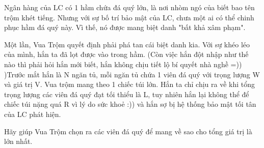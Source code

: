 Ngân hàng của LC có 1 hầm chứa đá quý lớn, là nơi nhòm ngó của biết bao tên trộm khét tiếng. Nhưng với sự bố trí bảo mật của LC, chưa một ai có thể chinh phục hầm đá quý này. Vì thế, nó được mang biệt danh "bất khả xâm phạm".  

   Một lần, Vua Trộm quyết định phải phá tan cái biệt danh kia. Với sự khéo léo của mình, hắn ta đã lọt được vào trong hầm. (Còn việc hắn đột nhập như thế nào thì phải hỏi hắn mới biết, hắn không chịu tiết lộ bí quyết nhà nghề =)) )Trước mắt hắn là N ngăn tủ, mỗi ngăn tủ chứa 1 viên đá quý với trọng lượng W và giá trị V. Vua trộm mang theo 1 chiếc túi lớn. Hắn ta chỉ chịu ra về khi tổng trọng lượng các viên đá quý đạt tối thiểu là L, tuy nhiên hắn lại không thể để chiếc túi nặng quá R vì lý do sức khoẻ :)) và hắn sợ bị hệ thống bảo mật tối tân của LC phát hiện.  

   Hãy giúp Vua Trộm chọn ra các viên đá quý để mang về sao cho tổng giá trị là lớn nhất.  

\